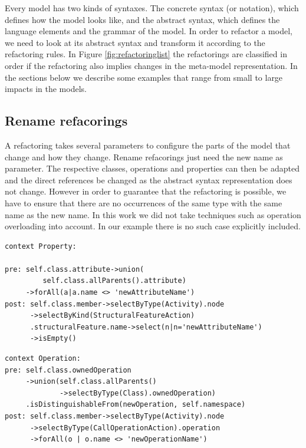 \documentclass{llncs}
\begin{document}
Every model has two kinds of syntaxes. The concrete syntax (or notation), which defines how the model looks like, and the abstract
syntax, which defines the language elements and the grammar of the model. In order to refactor a model, we need to look 
at its abstract syntax and transform it according to the refactoring rules. In Figure \ref{fig:refactoringlist} the 
refactorings are classified in order if the refactoring also implies changes in the meta-model representation. In the 
sections below we describe some examples that range from small to large impacts in the models.

\subsection{Rename refacorings}
\label{sec:renames}
A refactoring takes several parameters to configure the parts of the model that change and how they change. Rename 
refacorings just need the new name as parameter. The respective classes, operations and properties can then be adapted 
and the direct references be changed as the abstract syntax representation does not change. However in order to guarantee that the 
refactoring is possible, we have to ensure that there are no occurrences of the same type with the same name as the 
new name. In this work we did not take techniques such as operation overloading into account. In our example there is 
no such case explicitly included.

\begin{lstlisting}[language=OCL,caption=OCL for rename property,label=lst:renameproperty]
context Property:

pre: self.class.attribute->union(
         self.class.allParents().attribute)
     ->forAll(a|a.name <> 'newAttributeName')
post: self.class.member->selectByType(Activity).node
      ->selectByKind(StructuralFeatureAction)
      .structuralFeature.name->select(n|n='newAttributeName')
      ->isEmpty()
\end{lstlisting}

\begin{lstlisting}[language=OCL,caption=OCL for rename operation,label=lst:renameoperation]
context Operation:
pre: self.class.ownedOperation
     ->union(self.class.allParents()
             ->selectByType(Class).ownedOperation)
     .isDistinguishableFrom(newOperation, self.namespace)
post: self.class.member->selectByType(Activity).node
      ->selectByType(CallOperationAction).operation
      ->forAll(o | o.name <> 'newOperationName')
\end{lstlisting}
\end{document}
